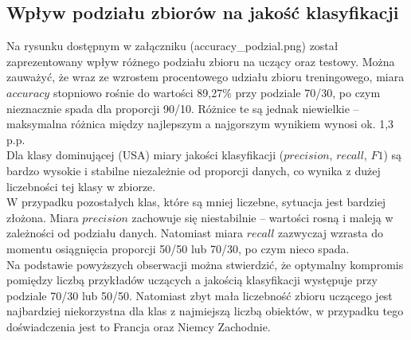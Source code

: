 \documentclass{article}
\begin{document}
\subsection{Wpływ podziału zbiorów na jakość klasyfikacji}
Na rysunku dostępnym w załączniku (accuracy\_podzial.png) został zaprezentowany wpływ różnego podziału zbioru na uczący oraz testowy. Można zauważyć, że wraz ze wzrostem procentowego udziału zbioru treningowego, miara \(accuracy\) stopniowo rośnie do wartości 89{,}27\% przy podziale 70/30, po czym nieznacznie spada dla proporcji 90/10. Różnice te są jednak niewielkie – maksymalna różnica między najlepszym a najgorszym wynikiem wynosi ok. 1,3 p.p. \\
Dla klasy dominującej (USA) miary jakości klasyfikacji (\(precision\), \(recall\), \(F1\)) są bardzo wysokie i stabilne niezależnie od proporcji danych, co wynika z dużej liczebności tej klasy w zbiorze. \\
W przypadku pozostałych klas, które są mniej liczebne, sytuacja jest bardziej złożona. Miara \(precision\) zachowuje się niestabilnie – wartości rosną i maleją w zależności od podziału danych. Natomiast miara \(recall\) zazwyczaj wzrasta do momentu osiągnięcia proporcji 50/50 lub 70/30, po czym nieco spada. \\
Na podstawie powyższych obserwacji można stwierdzić, że optymalny kompromis pomiędzy liczbą przykładów uczących a jakością klasyfikacji występuje przy podziale 70/30 lub 50/50. Natomiast zbyt mała liczebność zbioru uczącego jest najbardziej niekorzystna dla klas z najmiejszą liczbą obiektów, w przypadku tego doświadczenia jest to Francja oraz Niemcy Zachodnie.
\end{document}

